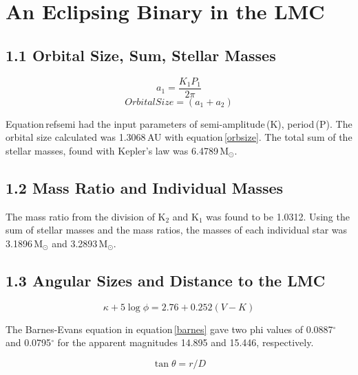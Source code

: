 \documentclass[onecolumn]{aastex6}
\begin{document}


\section{An Eclipsing Binary in the LMC}
\subsection{1.1 Orbital Size, Sum, Stellar Masses}
\begin{equation}
a_1 = \frac{K_1 P_1}{2\pi}
\label{semi}
\end{equation}
\begin{equation}
Orbital Size = (a_1 + a_2)
\label{orbsize}
\end{equation}

Equation\,ref{semi} had the input parameters of semi-amplitude\,(K), period\,(P). The orbital size calculated was 1.3068\,AU with equation\,\ref{orbsize}. The total sum of the stellar masses, found with Kepler's law was 6.4789\,M$_\odot$.

\subsection{1.2 Mass Ratio and Individual Masses}
The mass ratio from the division of K$_2$ and K$_1$ was found to be 1.0312. Using the sum of stellar masses and the mass ratios, the masses of each individual star was 3.1896\,M$_\odot$ and 3.2893\,M$_\odot$.

\subsection{1.3 Angular Sizes and Distance to the LMC}

\begin{equation}
\kappa+5\log{\phi} = 2.76+0.252(V-K)
\label{barnes}
\end{equation}

The Barnes-Evans equation in equation\,\ref{barnes} gave two phi values of 0.0887$^\circ$ and 0.0795$^\circ$ for the apparent magnitudes 14.895 and 15.446, respectively.

\begin{equation}
\tan{\theta}=r/D
\label{trig}
\end{equation}
\end{document}
